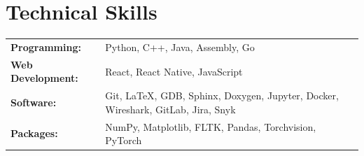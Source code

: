 \documentclass[10pt,a4paper]{article}
\newcommand{\resumeSection}[1]{
    \section*{#1}
}
\begin{document}

\resumeSection{Technical Skills}

\begin{tabularx}{\linewidth}{@{}>{\bfseries}p{3.4cm} X@{}}
    Programming: & Python, C++, Java, Assembly, Go \\

    Web Development: & React, React Native, JavaScript \\

    Software: & Git, \LaTeX, GDB, Sphinx, Doxygen, Jupyter, Docker, Wireshark, GitLab, Jira, Snyk \\

    Packages: & NumPy, Matplotlib, FLTK, Pandas, Torchvision, PyTorch
\end{tabularx}


%
%
%
\end{document}
